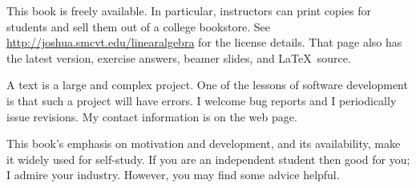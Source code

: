 {\medskip
{}
This book is freely available.
In particular, instructors can print copies for students 
and sell them out of a college bookstore.
See 
\url{http://joshua.smcvt.edu/linearalgebra}
for the license details.
That page also has the latest version, 
exercise answers, beamer slides,
and \LaTeX\ source.

A text is a large and complex project. 
One of the lessons of software
development is that such a project will have errors.
I welcome bug reports and 
I periodically issue revisions.
My contact information is on the web page.


\newcommand{\classday}[1]{\textsc{#1}}
\newcommand{\colwidth}{1.25in}

\medskip
{}
%
This book's emphasis on motivation and development,
and its availability, make it widely used for self-study.
If you are an independent student then good for you; I admire your industry.
However, you may find some advice helpful.

}
